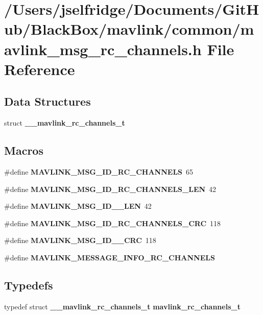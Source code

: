 \section{/\+Users/jselfridge/\+Documents/\+Git\+Hub/\+Black\+Box/mavlink/common/mavlink\+\_\+msg\+\_\+rc\+\_\+channels.h File Reference}
\label{mavlink__msg__rc__channels_8h}
\subsection*{Data Structures}
\begin{DoxyCompactItemize}
\item 
struct \textbf{ \+\_\+\+\_\+mavlink\+\_\+rc\+\_\+channels\+\_\+t}
\end{DoxyCompactItemize}
\subsection*{Macros}
\begin{DoxyCompactItemize}
\item 
\#define \textbf{ M\+A\+V\+L\+I\+N\+K\+\_\+\+M\+S\+G\+\_\+\+I\+D\+\_\+\+R\+C\+\_\+\+C\+H\+A\+N\+N\+E\+LS}~65
\item 
\#define \textbf{ M\+A\+V\+L\+I\+N\+K\+\_\+\+M\+S\+G\+\_\+\+I\+D\+\_\+\+R\+C\+\_\+\+C\+H\+A\+N\+N\+E\+L\+S\+\_\+\+L\+EN}~42
\item 
\#define \textbf{ M\+A\+V\+L\+I\+N\+K\+\_\+\+M\+S\+G\+\_\+\+I\+D\+\_\+\_\+\+L\+EN}~42
\item 
\#define \textbf{ M\+A\+V\+L\+I\+N\+K\+\_\+\+M\+S\+G\+\_\+\+I\+D\+\_\+\+R\+C\+\_\+\+C\+H\+A\+N\+N\+E\+L\+S\+\_\+\+C\+RC}~118
\item 
\#define \textbf{ M\+A\+V\+L\+I\+N\+K\+\_\+\+M\+S\+G\+\_\+\+I\+D\+\_\+\_\+\+C\+RC}~118
\item 
\#define \textbf{ M\+A\+V\+L\+I\+N\+K\+\_\+\+M\+E\+S\+S\+A\+G\+E\+\_\+\+I\+N\+F\+O\+\_\+\+R\+C\+\_\+\+C\+H\+A\+N\+N\+E\+LS}
\end{DoxyCompactItemize}
\subsection*{Typedefs}
\begin{DoxyCompactItemize}
\item 
typedef struct \textbf{ \+\_\+\+\_\+mavlink\+\_\+rc\+\_\+channels\+\_\+t} \textbf{ mavlink\+\_\+rc\+\_\+channels\+\_\+t}
\end{DoxyCompactItemize}


